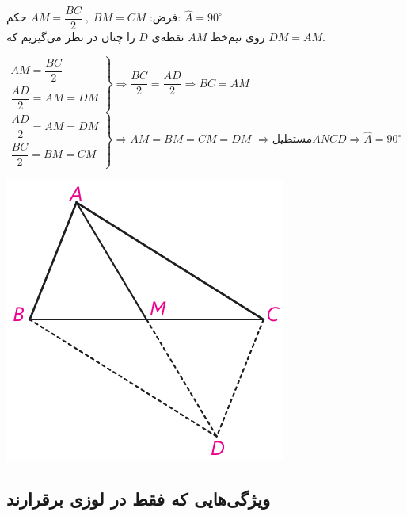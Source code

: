 \documentclass[12pt, a4paper]{book}
\begin{document}
  \begin{minipage}{.7\textwidth}
 	 فرض: 
 	$
 	 AM = \dfrac{BC}{2} \; , \; BM = CM
 	$
 	\hfill حکم:
 	$ 
 	\widehat{A} = 90^{\circ}
 	$\\
 	روی نیم‌خط $AM$ نقطه‌ی $D$ را چنان در نظر می‌گیریم که $DM = AM$.
 	\begin{flushleft}
 		$ 
	 		\left. 
		 		\begin{array}{crr}
		 			AM = \dfrac{BC}{2} \\
		 			\dfrac{AD}{2} = AM = DM
		 		\end{array}
	 		\right\}
	 		\Rightarrow \dfrac{BC}{2} = \dfrac{AD}{2} \Rightarrow BC =AM 
 		$
 		$
			\left. 
	 			\begin{array}{crr}
	 				\dfrac{AD}{2} =  AM = DM\\
	 				\dfrac{BC}{2} = BM = CM
	 			\end{array}
			\right\}
 			\Rightarrow AM = BM = CM = DM
 		$
 		$
 			\Rightarrow \mbox{مستطیل‌} ANCD \Rightarrow \widehat{A} = 90^{\circ}
 		$
 		
 	\end{flushleft}
 \end{minipage}
 \begin{minipage}{.3\textwidth}
 	\begin{flushleft}
 		\includegraphics[scale=0.8]{"Shapes/Fasl - 3/Dars 1/2-2.2.pdf"}
 	\end{flushleft}
 \end{minipage}
 

\subsection{ویژگی‌هایی که فقط در لوزی برقرارند}
\end{document}
